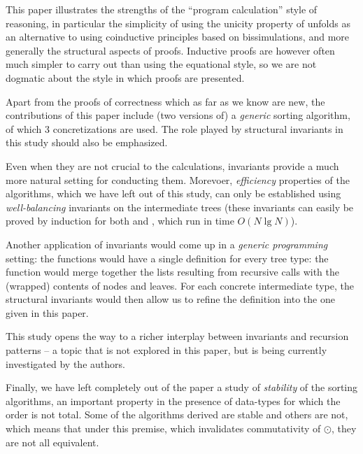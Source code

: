 \documentclass[a4paper,11pt]{llncs}
\begin{document}
This paper illustrates the strengths of the ``program calculation''
style of reasoning, in particular the simplicity of using the unicity
property of unfolds as an alternative to using coinductive principles
based on bissimulations, and more generally the structural aspects of
proofs. Inductive proofs are however often much simpler to carry out
than using the equational style, so we are not dogmatic about the
style in which proofs are presented.

Apart from the proofs of correctness which as far as we know are new,
the contributions of this paper include (two versions of) a
\emph{generic} sorting algorithm, of which 3 concretizations are used.
The role played by structural invariants in this study should also be
emphasized. 

Even when they are not crucial to the calculations, invariants provide
a much more natural setting for conducting them. Morevoer,
\emph{efficiency} properties of the algorithms, which we have left out
of this study, can only be established using \emph{well-balancing}
invariants on the intermediate trees (these invariants can easily be
proved by induction for both  and , which run
in time $O(N\lg N)$).

Another application of invariants would come up in a \emph{generic
  programming} setting: the  functions would have a single
definition for every tree type: the function would merge together the
lists resulting from recursive calls with the (wrapped) contents of
nodes and leaves. For each concrete intermediate type, the structural
invariants would then allow us to refine the definition into the one
given in this paper.

This study opens the way to a richer interplay between invariants and
recursion patterns -- a topic that is not explored in this paper, but
is being currently investigated by the authors.

Finally, we have left completely out of the paper a study of
\emph{stability} of the sorting algorithms, an important property in
the presence of data-types for which the order is not total. Some of
the algorithms derived are stable and others are not, which means that
under this premise, which invalidates commutativity of $\odot$, they
are not all equivalent.
\end{document}
